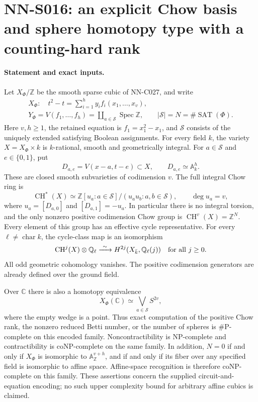 \section{NN-S016: an explicit Chow basis and sphere homotopy type with a counting-hard rank}

\paragraph{Statement and exact inputs.}
Let $X_\Phi/\mathbb Z$ be the smooth sparse cubic of NN-C027, and write
\begin{gather*}
 X_\Phi:\quad t^2-t=\sum_{i=1}^h y_i f_i(x_1,\ldots,x_v),\\
 Y_\Phi=V(f_1,\ldots,f_h)=\coprod_{a\in\mathcal S}\operatorname{Spec}\mathbb Z,
 \qquad |\mathcal S|=N=\#\operatorname{SAT}(\Phi).
\end{gather*}
Here $v,h\ge1$, the retained equation is $f_1=x_1^2-x_1$, and
$\mathcal S$ consists of the uniquely extended satisfying Boolean assignments.
For every field $k$, the variety $X=X_\Phi\times k$ is $k$-rational,
smooth and geometrically integral. For $a\in\mathcal S$ and $e\in\{0,1\}$,
put
\[
 D_{a,e}=V(x-a,t-e)\subset X,\qquad D_{a,e}\simeq\mathbb A^h_k.
\]
These are closed smooth subvarieties of codimension $v$. The full integral
Chow ring is
\begin{equation}\label{eq:S016-chow}
 \operatorname{CH}^*(X)\simeq
 \mathbb Z[u_a:a\in\mathcal S]/(u_a u_b:a,b\in\mathcal S),
 \qquad \deg u_a=v,
\end{equation}
where $u_a=[D_{a,0}]$ and $[D_{a,1}]=-u_a$.
In particular there is no integral torsion, and the only nonzero positive
codimension Chow group is $\operatorname{CH}^v(X)=\mathbb Z^N$.
Every element of this group has an effective cycle representative.
For every $\ell\ne\operatorname{char}k$, the cycle-class map is an isomorphism
\begin{equation}\label{eq:S016-cycle}
 \operatorname{CH}^j(X)\otimes\mathbb Q_\ell
       \xrightarrow{\ \sim\ }
 H^{2j}(X_{\bar k},\mathbb Q_\ell(j))
 \quad\hbox{for all }j\ge0.
\end{equation}
All odd geometric cohomology vanishes. The positive codimension generators
are already defined over the ground field.

Over $\mathbb C$ there is also a homotopy equivalence
\begin{equation}\label{eq:S016-wedge}
                  X_\Phi(\mathbb C)\simeq\bigvee_{a\in\mathcal S}S^{2v},
\end{equation}
where the empty wedge is a point. Thus exact computation of the positive
Chow rank, the nonzero reduced Betti number, or the number of spheres is
\#P-complete on this encoded family. Noncontractibility is NP-complete and
contractibility is coNP-complete on the same family. In addition, $N=0$ if and only if $X_\Phi$ is isomorphic to
$\mathbb A^{v+h}_{\mathbb Z}$, and if and only if its fiber over any
specified field is isomorphic to affine space. Affine-space recognition
is therefore coNP-complete on this family. These assertions concern
the supplied circuit-and-equation encoding; no such upper complexity bound
for arbitrary affine cubics is claimed.


